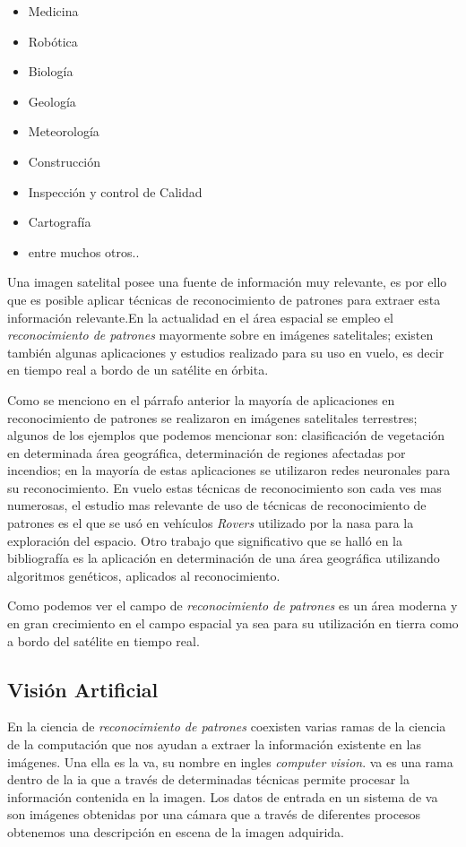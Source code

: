 \begin{itemize}
	\item Medicina
	\item Robótica
	\item Biología
	\item Geología 
	\item Meteorología
	\item Construcción 
	\item Inspección y control de Calidad
	\item Cartografía
	\item entre muchos otros..
\end{itemize}

Una imagen satelital posee una fuente de información muy relevante, es por ello que es posible aplicar técnicas de reconocimiento de patrones para extraer esta información relevante.En la actualidad en el área espacial se empleo el \textit{reconocimiento de patrones} mayormente sobre en imágenes satelitales; existen también algunas aplicaciones y estudios realizado para su uso en vuelo, es decir en tiempo real a bordo de un satélite en órbita. 

Como se menciono en el párrafo anterior la mayoría de aplicaciones en reconocimiento de patrones  se realizaron en imágenes satelitales terrestres; algunos de los ejemplos que podemos mencionar son: clasificación de vegetación en determinada área geográfica, determinación de regiones afectadas por incendios; en la  mayoría de estas aplicaciones se utilizaron redes neuronales 
para su reconocimiento. En vuelo estas técnicas de reconocimiento son cada ves mas numerosas, el estudio mas relevante de uso de técnicas de reconocimiento de patrones es el que se usó en vehículos \textit{Rovers} utilizado por la \ac{nasa} para la exploración del espacio. Otro trabajo que significativo que se halló en la bibliografía es la aplicación en determinación de una área geográfica utilizando algoritmos genéticos, aplicados al reconocimiento. 

Como podemos ver el campo de \textit{reconocimiento de patrones} es un área moderna y en gran crecimiento en el campo espacial ya sea para su utilización en tierra como a bordo del satélite en tiempo real.


\subsection{Visión Artificial}\label{sub:introva}
En la ciencia de \textit{reconocimiento de patrones} coexisten varias ramas de la ciencia de la computación que nos ayudan a extraer la información existente en las imágenes. Una  ella es la \ac{va}, su nombre en ingles \textit{computer vision}.  \ac{va} es una rama dentro de la \ac{ia} que a través de determinadas técnicas permite procesar la información contenida en la imagen. Los datos de entrada en un sistema de \ac{va} son imágenes obtenidas por una cámara que a través de diferentes procesos obtenemos una descripción en escena de la imagen adquirida.
 
